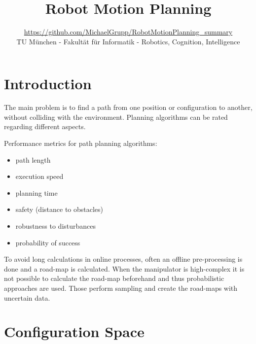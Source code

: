 
\graphicspath{{images/}}

\usepackage[
	colorlinks=true,
	urlcolor=blue,
	linkcolor=black
]{hyperref}

\title{Robot Motion Planning}
\author{\url{https://github.com/MichaelGrupp/RobotMotionPlanning_summary} \\ TU München - Fakultät für Informatik - Robotics, Cognition, Intelligence}
\date{\the\year}




\maketitle

\begin{multicols*}{2}  %


\section{Introduction}
The main problem is to find a path from one position or configuration to another, without colliding with the environment. Planning algorithms can be rated regarding different aspects.\par

Performance metrics for path planning algorithms:
\begin{itemize}
	\item path length
	\item execution speed
	\item planning time
	\item safety (distance to obstacles)
	\item robustness to disturbances
	\item probability of success
\end{itemize}
\vspace{2.5mm}
To avoid long calculations in online processes, often an offline
pre-processing is done and a road-map is calculated. When
the manipulator is high-complex it is not possible to calculate
the road-map beforehand and thus probabilistic approaches are
used. Those perform sampling and create the road-maps with
uncertain data.

\section{Configuration Space}

\end{multicols*}
